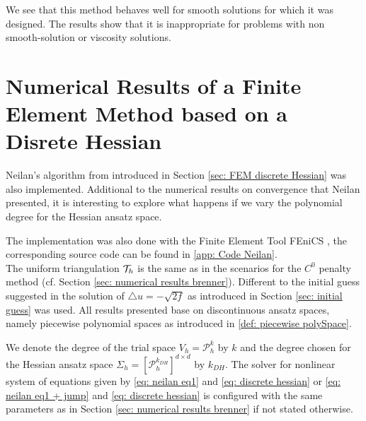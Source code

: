 
We see that this method behaves well for smooth solutions for which it was designed. The results show that it is inappropriate for problems with non smooth-solution or viscosity solutions.

\section{Numerical Results of a Finite Element Method based on a Disrete Hessian}\label{sec: numerical results neilan}

Neilan's algorithm from \cite{Neilan2014} introduced in Section \ref{sec: FEM discrete Hessian} was also implemented.
Additional to the numerical results on convergence that Neilan presented, it is interesting to explore what happens if we vary the polynomial degree for the Hessian ansatz space. 

The implementation was also done with the Finite Element Tool FEniCS \cite{FEniCS}, the corresponding source code can be found in \ref{app: Code Neilan}. \\
The uniform triangulation $\mathcal{T}_h$ is the same as in the scenarios for the $C^0$ penalty method (cf. Section \ref{sec: numerical results brenner}).
Different to the initial guess suggested in \cite{Neilan2014} the solution of $\triangle u = -\sqrt{2f}$ as introduced in Section \ref{sec: initial guess} was used. All results presented base on discontinuous ansatz spaces, namely piecewise polynomial spaces as introduced in \ref{def: piecewise polySpace}.

We denote the degree of the trial space $V_h=\mathcal P_h^k$ by $k$ and the degree chosen for the Hessian ansatz space $\Sigma_h = [\mathcal{P}_h^{k_{DH}}]^{d \times d}$ by $k_{DH}$. The solver for nonlinear system of equations given by \eqref{eq: neilan eq1} and \eqref{eq: discrete hessian} or \eqref{eq: neilan eq1 + jump} and \eqref{eq: discrete hessian} is configured with the same parameters as in Section \ref{sec: numerical results brenner} if not stated otherwise. 









